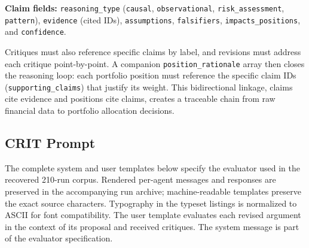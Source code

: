 \documentclass{article}
\begin{document}
\textbf{Claim fields:} \texttt{reasoning\_type} (\texttt{causal}, \texttt{observational}, \texttt{risk\_assessment}, \texttt{pattern}),
\texttt{evidence} (cited IDs), \texttt{assumptions}, \texttt{falsifiers}, \texttt{impacts\_positions}, and \texttt{confidence}.

Critiques must also reference specific claims by label, and revisions must address each critique point-by-point. A companion \texttt{position\_rationale} array then closes the reasoning loop: each portfolio
position must reference the specific claim IDs (\texttt{supporting\_claims}) that justify its
weight. This bidirectional linkage, claims cite evidence and positions cite claims, creates a
traceable chain from raw financial data to portfolio allocation decisions. 


\subsection{CRIT Prompt}
\label{app:crit-prompt}

The complete system and user templates below specify the evaluator used in the recovered 210-run corpus. Rendered per-agent messages and responses are preserved in the accompanying run archive; machine-readable templates preserve the exact source characters. Typography in the typeset listings is normalized to ASCII for font compatibility. The user template evaluates each revised argument in the context of its proposal and received critiques. The system message is part of the evaluator specification.
\end{document}
